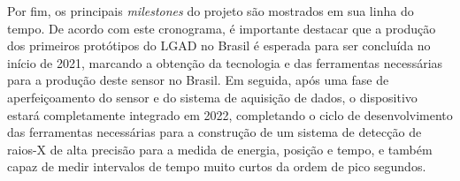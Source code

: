 Por fim, os principais {\it milestones} do projeto são mostrados em sua linha do tempo. De acordo com este cronograma, é importante destacar que a produção dos primeiros protótipos do LGAD no Brasil é esperada para ser concluída no início de 2021, marcando a obtenção da tecnologia e das ferramentas necessárias para a produção deste sensor no Brasil. Em seguida, após uma fase de aperfeiçoamento do sensor e do sistema de aquisição de dados, o dispositivo estará completamente integrado em 2022, completando o ciclo de desenvolvimento das ferramentas necessárias para a construção de um sistema de detecção de raios-X de alta precisão para a medida de energia, posição e tempo, e também capaz de medir intervalos de tempo muito curtos da ordem de pico segundos.
